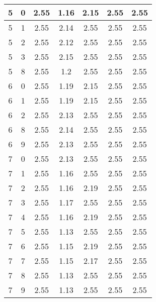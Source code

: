 \begin{longtable}{|c|c||c||c|c||c|c|}
	5 & 0 & 2.55 & 1.16 & 2.15 & 2.55 & 2.55 \\ \hline
	5 & 1 & 2.55 & 2.14 & 2.55 & 2.55 & 2.55 \\ \hline
	5 & 2 & 2.55 & 2.12 & 2.55 & 2.55 & 2.55 \\ \hline
	5 & 3 & 2.55 & 2.15 & 2.55 & 2.55 & 2.55 \\ \hline
	5 & 8 & 2.55 & 1.2 & 2.55 & 2.55 & 2.55 \\ \hline
	6 & 0 & 2.55 & 1.19 & 2.15 & 2.55 & 2.55 \\ \hline
	6 & 1 & 2.55 & 1.19 & 2.15 & 2.55 & 2.55 \\ \hline
	6 & 2 & 2.55 & 2.13 & 2.55 & 2.55 & 2.55 \\ \hline
	6 & 8 & 2.55 & 2.14 & 2.55 & 2.55 & 2.55 \\ \hline
	6 & 9 & 2.55 & 2.13 & 2.55 & 2.55 & 2.55 \\ \hline
	7 & 0 & 2.55 & 2.13 & 2.55 & 2.55 & 2.55 \\ \hline
	7 & 1 & 2.55 & 1.16 & 2.55 & 2.55 & 2.55 \\ \hline
	7 & 2 & 2.55 & 1.16 & 2.19 & 2.55 & 2.55 \\ \hline
	7 & 3 & 2.55 & 1.17 & 2.55 & 2.55 & 2.55 \\ \hline
	7 & 4 & 2.55 & 1.16 & 2.19 & 2.55 & 2.55 \\ \hline
	7 & 5 & 2.55 & 1.13 & 2.55 & 2.55 & 2.55 \\ \hline
	7 & 6 & 2.55 & 1.15 & 2.19 & 2.55 & 2.55 \\ \hline
	7 & 7 & 2.55 & 1.15 & 2.17 & 2.55 & 2.55 \\ \hline
	7 & 8 & 2.55 & 1.13 & 2.55 & 2.55 & 2.55 \\ \hline
	7 & 9 & 2.55 & 1.13 & 2.55 & 2.55 & 2.55 \\ \hline
\end{longtable}
\clearpage{}
